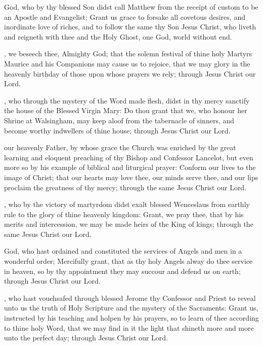  God, who by thy blessed Son didst call Matthew from the receipt of custom to be an Apostle and Evangelist; Grant us grace to forsake all covetous desires, and inordinate love of riches, and to follow the same thy Son Jesus Christ, who liveth and reigneth with thee and the Holy Ghost, one God, world without end.

, we beseech thee, Almighty God; that the solemn festival of thine holy Martyrs Maurice and his Companions may cause us to rejoice, that we may glory in the heavenly birthday of those upon whose prayers we rely; through Jesus Christ our Lord.

, who through the mystery of the Word made flesh, didst in thy mercy sanctify the house of the Blessed Virgin Mary: Do thou grant that we, who honour her Shrine at Walsingham, may keep aloof from the tabernacle of sinners, and become worthy indwellers of thine house; through Jesus Christ our Lord.

 our heavenly Father, by whose grace the Church was enriched by the great learning and eloquent preaching of thy Bishop and Confessor Lancelot, but even more so by his example of biblical and liturgical prayer: Conform our lives to the image of Christ; that our hearts may love thee, our minds serve thee, and our lips proclaim the greatness of thy mercy; through the same Jesus Christ our Lord.

, who by the victory of martyrdom didst exalt blessed Wenceslaus from earthly rule to the glory of thine heavenly kingdom: Grant, we pray thee, that by his merits and intercession, we may be made heirs of the King of kings; through the same Jesus Christ our Lord.

 God, who hast ordained and constituted the services of Angels and men in a wonderful order; Mercifully grant, that as thy holy Angels alway do thee service in heaven, so by thy appointment they may succour and defend us on earth; through Jesus Christ our Lord.

, who hast vouchsafed through blessed Jerome thy Confessor and Priest to reveal unto us the truth of Holy Scripture and the mystery of the Sacraments: Grant us, instructed by his teaching and holpen by his prayers, so to learn of thee according to thine holy Word, that we may find in it the light that shineth more and more unto the perfect day; through Jesus Christ our Lord.

